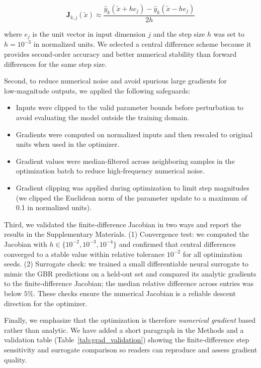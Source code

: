\documentclass[11pt]{article}
\begin{document}
\setcounter{equation}{11}
\begin{equation}\label{eq:12}
\boxed{\mathbf{J}_{k,j}(\tilde{x}) \approx \frac{\hat{y}_k(\tilde{x}+h e_j) - \hat{y}_k(\tilde{x}-h e_j)}{2h}}
\end{equation}



where \(e_j\) is the unit vector in input dimension \(j\) and the step size \(h\) was set to \(h=10^{-3}\) in normalized units. We selected a central difference scheme because it provides second‑order accuracy and better numerical stability than forward differences for the same step size.

Second, to reduce numerical noise and avoid spurious large gradients for low‑magnitude outputs, we applied the following safeguards:
\begin{itemize}
  \item Inputs were clipped to the valid parameter bounds before perturbation to avoid evaluating the model outside the training domain.
  \item Gradients were computed on normalized inputs and then rescaled to original units when used in the optimizer.
  \item Gradient values were median‑filtered across neighboring samples in the optimization batch to reduce high‑frequency numerical noise.
  \item Gradient clipping was applied during optimization to limit step magnitudes (we clipped the Euclidean norm of the parameter update to a maximum of 0.1 in normalized units).
\end{itemize}

Third, we validated the finite‑difference Jacobian in two ways and report the results in the Supplementary Materials. (1) Convergence test: we computed the Jacobian with \(h\in\{10^{-2},10^{-3},10^{-4}\}\) and confirmed that central differences converged to a stable value within relative tolerance \(10^{-2}\) for all optimization seeds. (2) Surrogate check: we trained a small differentiable neural surrogate to mimic the GBR predictions on a held‑out set and compared its analytic gradients to the finite‑difference Jacobian; the median relative difference across entries was below \(5\%\). These checks ensure the numerical Jacobian is a reliable descent direction for the optimizer.

Finally, we emphasize that the optimization is therefore \emph{numerical gradient} based rather than analytic. We have added a short paragraph in the Methods and a validation table (Table~\ref{tab:grad_validation}) showing the finite‑difference step sensitivity and surrogate comparison so readers can reproduce and assess gradient quality.
\end{document}
